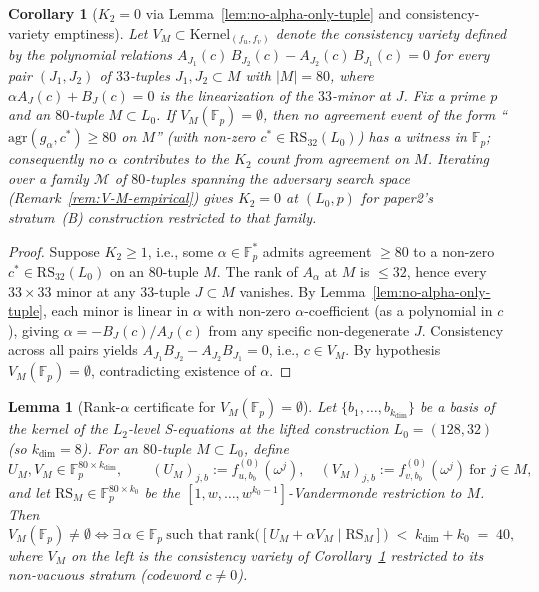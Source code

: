 \documentclass[11pt]{article}
\newtheorem{lemma}[theorem]{Lemma}
\newtheorem{corollary}[theorem]{Corollary}
\theoremstyle{definition}
\theoremstyle{remark}
\begin{document}
\begin{corollary}[$K_2 = 0$ via Lemma~\ref{lem:no-alpha-only-tuple} and consistency-variety emptiness]
\label{cor:K2-zero-via-lemma}
Let $V_M \subset \mathrm{Kernel}_{(f_u, f_v)}$ denote the consistency variety
defined by the polynomial relations
$A_{J_1}(c)\, B_{J_2}(c) - A_{J_2}(c)\, B_{J_1}(c) = 0$
for every pair $(J_1, J_2)$ of $33$-tuples $J_1, J_2 \subset M$ with
$|M| = 80$, where $\alpha A_J(c) + B_J(c) = 0$ is the linearization of the
$33$-minor at $J$. Fix a prime $p$ and an $80$-tuple $M \subset L_0$.
If $V_M(\mathbb{F}_p) = \emptyset$, then no agreement event of the form
``$\mathrm{agr}(g_\alpha, c^*) \geq 80$ on $M$'' (with non-zero
$c^* \in \mathrm{RS}_{32}(L_0)$) has a witness in $\mathbb{F}_p$;
consequently no $\alpha$ contributes to the $K_2$ count from agreement on
$M$. Iterating over a family $\mathcal{M}$ of $80$-tuples spanning the
adversary search space (Remark~\ref{rem:V-M-empirical}) gives
$K_2 = 0$ at $(L_0, p)$ for paper2's stratum~(B) construction
restricted to that family.
\end{corollary}

\begin{proof}
Suppose $K_2 \geq 1$, i.e., some $\alpha \in \mathbb{F}_p^*$ admits agreement
$\geq 80$ to a non-zero $c^* \in \mathrm{RS}_{32}(L_0)$ on an $80$-tuple $M$.
The rank of $A_\alpha$ at $M$ is $\leq 32$, hence every $33 \times 33$ minor at
any $33$-tuple $J \subset M$ vanishes. By Lemma~\ref{lem:no-alpha-only-tuple},
each minor is linear in $\alpha$ with non-zero $\alpha$-coefficient (as a
polynomial in $c$), giving $\alpha = -B_J(c) / A_J(c)$ from any specific
non-degenerate $J$. Consistency across all pairs yields
$A_{J_1} B_{J_2} - A_{J_2} B_{J_1} = 0$, i.e., $c \in V_M$. By hypothesis
$V_M(\mathbb{F}_p) = \emptyset$, contradicting existence of $\alpha$.
\end{proof}

\begin{lemma}[Rank-$\alpha$ certificate for $V_M(\mathbb{F}_p) = \emptyset$]
\label{lem:rank-alpha-certificate}
Let $\{b_1, \ldots, b_{k_{\dim}}\}$ be a basis of the kernel of the
$L_2$-level S-equations at the lifted construction $L_0 = (128, 32)$
(so $k_{\dim} = 8$). For an $80$-tuple $M \subset L_0$, define
\[
  U_M, V_M \in \mathbb{F}_p^{80 \times k_{\dim}}, \qquad
  (U_M)_{j, b} := f_{u, b_b}^{(0)}(\omega^j),\quad
  (V_M)_{j, b} := f_{v, b_b}^{(0)}(\omega^j)\ \text{for } j \in M,
\]
and let $\mathrm{RS}_M \in \mathbb{F}_p^{80 \times k_0}$ be the
$[1, w, \ldots, w^{k_0 - 1}]$-Vandermonde restriction to $M$. Then
\[
  V_M(\mathbb{F}_p) \neq \emptyset
  \iff
  \exists\, \alpha \in \mathbb{F}_p\ \text{such that}\
  \mathrm{rank}\bigl([U_M + \alpha V_M \mid \mathrm{RS}_M]\bigr)
  \;<\; k_{\dim} + k_0 \;=\; 40,
\]
where $V_M$ on the left is the consistency variety of
Corollary~\ref{cor:K2-zero-via-lemma} restricted to its non-vacuous
stratum (codeword $c \neq 0$).
\end{lemma}
\end{document}
